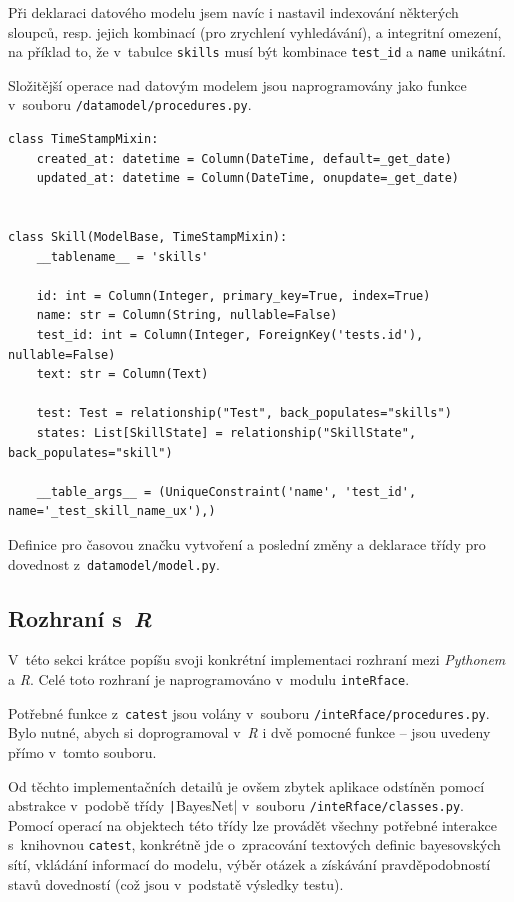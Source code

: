 \documentclass[a4paper,twoside,12pt]{scrbook}
\begin{document}
Při deklaraci datového modelu jsem navíc i nastavil indexování některých sloupců, resp. jejich kombinací (pro zrychlení vyhledávání), a integritní omezení, na příklad to, že v~tabulce \texttt{skills} musí být kombinace \texttt{test\_id} a \texttt{name} unikátní.

Složitější operace nad datovým modelem jsou naprogramovány jako funkce v~souboru \texttt{/datamodel/procedures.py}.

\begin{listing}
\centering
\begin{verbatim}
class TimeStampMixin:
    created_at: datetime = Column(DateTime, default=_get_date)
    updated_at: datetime = Column(DateTime, onupdate=_get_date)


class Skill(ModelBase, TimeStampMixin):
    __tablename__ = 'skills'

    id: int = Column(Integer, primary_key=True, index=True)
    name: str = Column(String, nullable=False)
    test_id: int = Column(Integer, ForeignKey('tests.id'), nullable=False)
    text: str = Column(Text)

    test: Test = relationship("Test", back_populates="skills")
    states: List[SkillState] = relationship("SkillState", back_populates="skill")

    __table_args__ = (UniqueConstraint('name', 'test_id', name='_test_skill_name_ux'),)
\end{verbatim}
\caption{Definice  pro časovou značku vytvoření a poslední změny a deklarace třídy pro dovednost z~\texttt{datamodel/model.py}.}
\label{lst:SkillDeclaration}
\end{listing}

\subsection{Rozhraní s~\textit{R}}
V~této sekci krátce popíšu svoji konkrétní implementaci rozhraní mezi \textit{Pythonem} a \textit{R}. Celé toto rozhraní je naprogramováno v~modulu \texttt{inteRface}.

Potřebné funkce z~\texttt{catest} jsou volány v~souboru \texttt{/inteRface/procedures.py}. Bylo nutné, abych si doprogramoval v~\textit{R} i dvě pomocné funkce -- jsou uvedeny přímo v~tomto souboru.

Od těchto implementačních detailů je ovšem zbytek aplikace odstíněn pomocí abstrakce v~podobě třídy \texttt|BayesNet| v~souboru \texttt{/inteRface/classes.py}. Pomocí operací na objektech této třídy lze provádět všechny potřebné interakce s~knihovnou \texttt{catest}, konkrétně jde o~zpracování textových definic bayesovských sítí, vkládání informací do modelu, výběr otázek a získávání pravděpodobností stavů dovedností (což jsou v~podstatě výsledky testu).
\end{document}
